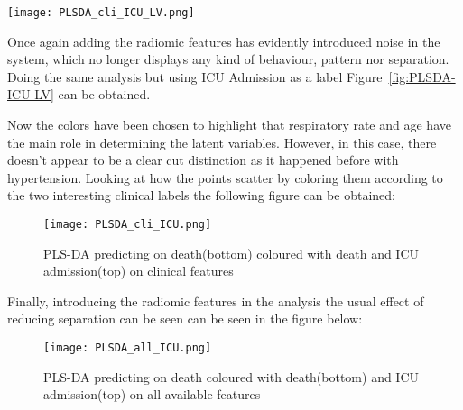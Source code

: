 \begin{figure*}[htbp]
  		\texttt{[image: PLSDA\_cli\_ICU\_LV.png]}
          \caption{PLS-DA predicting on death coloured with Age and respiratory rate on clinical features\label{fig:PLSDA-ICU-LV}}
\end{figure*}

Once again adding the radiomic features has evidently introduced noise in the system, which no longer displays any kind of behaviour, pattern nor separation.
Doing the same analysis but using ICU Admission as a label Figure~\ref{fig:PLSDA-ICU-LV} can be obtained. 

Now the colors have been chosen to highlight that respiratory rate and age have the main role in determining the latent variables. However, in this case, there doesn't appear to be a clear cut distinction as it happened before with hypertension.
Looking at how the points scatter by coloring them according to the two interesting clinical labels the following figure can be obtained:

\begin{figure}[H]
  		\texttt{[image: PLSDA\_cli\_ICU.png]}
          \caption{PLS-DA predicting on death(bottom) coloured with death and ICU admission(top) on clinical features\label{fig:PLSDA-ICU}}
\end{figure}

Finally, introducing the radiomic features in the analysis the usual effect of reducing separation can be seen can be seen in the figure below:

\begin{figure}[H]
  		\texttt{[image: PLSDA\_all\_ICU.png]}
          \caption{PLS-DA predicting on death coloured with death(bottom) and ICU admission(top) on all available features\label{fig:PLSDA-ICU-all}}
\end{figure}
 